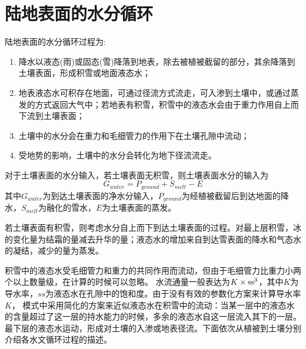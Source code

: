 \chapter{陆地表面的水分循环}

陆地表面的水分循环过程为:
\begin{enumerate}
    \item 降水以液态(雨)或固态(雪)降落到地表，除去被植被截留的部分，其余降落到土壤表面，形成积雪或地面液态水；
    \item 地表液态水可积存在地面，可通过径流方式流走，可入渗到土壤中，或通过蒸发的方式返回大气中；若地表有积雪，积雪中的液态水会由于重力作用自上而下流到土壤表面；
    \item 土壤中的水分会在重力和毛细管力的作用下在土壤孔隙中流动；
    \item 受地势的影响，土壤中的水分会转化为地下径流流走。
\end{enumerate}

对于土壤表面的水分输入，若土壤表面无积雪，则土壤表面水分的输入为
\begin{equation}
G_{water}=P_{ground}+S_{melt}-E
\end{equation}
其中$G_{water}$为到达土壤表面的净水分输入，$P_{ground}$为经植被截留后到达地面的降水，$S_{melt}$为融化的雪水，$E$为土壤表面的蒸发。

若土壤表面有积雪，则考虑水分自上而下到达土壤表面的过程。对最上层积雪，冰的变化量为结霜的量减去升华的量；液态水的增加来自到达雪表面的降水和气态水的凝结，减少的量为蒸发。

积雪中的液态水受毛细管力和重力的共同作用而流动，但由于毛细管力比重力小两个以上数量级，在计算的时候可以忽略。
水流通量一般表达为$K\times{\rm ss}^3$，其中$K$为导水率，$ss$为液态水在孔隙中的饱和度。由于没有有效的参数化方案来计算导水率$K$，
模式中采用简化的方案来近似液态水在积雪中的流动：当某一层中的液态水的含量超过了这一层的持水能力的时候，多余的液态水自这一层流入其下的一层。
最下层的液态水运动，形成对土壤的入渗或地表径流。下面依次从植被到土壤分别介绍各水文循环过程的描述。
